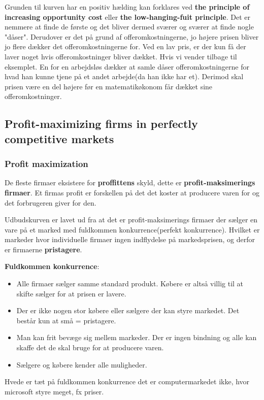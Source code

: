 Grunden til kurven har en positiv hælding kan forklares ved \textbf{the principle of increasing opportunity cost} eller \textbf{the low-hanging-fuit principle}. Det er nemmere at finde de første og det bliver dermed sværer og sværer at finde nogle "dåser". Derudover er det på grund af offeromkostningerne, jo højere prisen bliver jo flere dækker det offeromkostningerne for. Ved en lav pris, er der kun få der laver noget hvis offeromkostninger bliver dækket. Hvis vi vender tilbage til eksemplet. En for en arbejdsløs dækker at samle dåser offeromkostningerne for hvad han kunne tjene på et andet arbejde(da han ikke har et). Derimod skal prisen være en del højere før en matematikøkonom får dækket sine offeromkostninger. 

\subsection{Profit-maximizing firms in perfectly competitive markets}
\subsubsection{Profit maximization}
De fleste firmaer eksistere for \textbf{proffittens} skyld, dette er \textbf{profit-maksimerings firmaer}. Et firmas profit er forskellen på det det koster at producere varen for og det forbrugeren giver for den. 

Udbudskurven er lavet ud fra at det er profit-maksimerings firmaer der sælger en vare på et marked med fuldkommen konkurrence(perfekt konkurrence). Hvilket er markeder hvor individuelle firmaer ingen indflydelse på markedsprisen, og derfor er firmaerne \textbf{pristagere}.

\textbf{Fuldkommen konkurrence}:\\
\begin{itemize}
    \item Alle firmaer sælger samme standard produkt. Købere er altså villig til at skifte sælger for at prisen er lavere.
    \item Der er ikke nogen stor købere eller sælgere der kan styre markedet. Det består kun at små = pristagere.
    \item Man kan frit bevæge sig mellem markeder. Der er ingen bindning og alle kan skaffe det de skal bruge for at producere varen.
    \item Sælgere og købere kender alle muligheder. 
\end{itemize}
Hvede er tæt på fuldkommen konkurrence det er computermarkedet ikke, hvor microsoft styre meget, fx priser.

